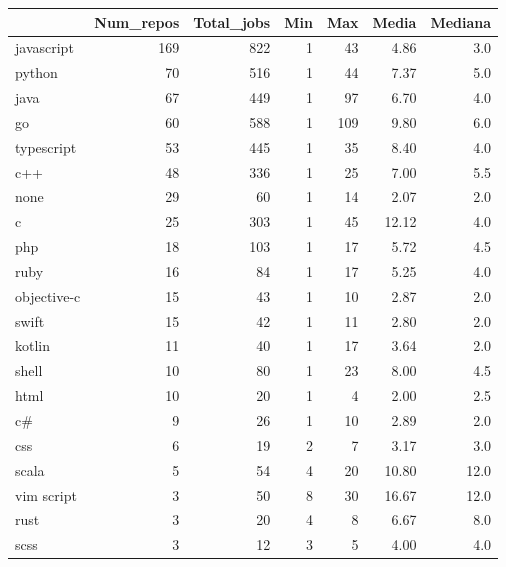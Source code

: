 \begin{tabular}{lrrrrrr}
\toprule
{} &  Num\_repos &  Total\_jobs &  Min &  Max &   Media &  Mediana \\
\midrule
javascript    &        169 &         822 &    1 &   43 &    4.86 &      3.0 \\
python        &         70 &         516 &    1 &   44 &    7.37 &      5.0 \\
java          &         67 &         449 &    1 &   97 &    6.70 &      4.0 \\
go            &         60 &         588 &    1 &  109 &    9.80 &      6.0 \\
typescript    &         53 &         445 &    1 &   35 &    8.40 &      4.0 \\
c++           &         48 &         336 &    1 &   25 &    7.00 &      5.5 \\
none          &         29 &          60 &    1 &   14 &    2.07 &      2.0 \\
c             &         25 &         303 &    1 &   45 &   12.12 &      4.0 \\
php           &         18 &         103 &    1 &   17 &    5.72 &      4.5 \\
ruby          &         16 &          84 &    1 &   17 &    5.25 &      4.0 \\
objective-c   &         15 &          43 &    1 &   10 &    2.87 &      2.0 \\
swift         &         15 &          42 &    1 &   11 &    2.80 &      2.0 \\
kotlin        &         11 &          40 &    1 &   17 &    3.64 &      2.0 \\
shell         &         10 &          80 &    1 &   23 &    8.00 &      4.5 \\
html          &         10 &          20 &    1 &    4 &    2.00 &      2.5 \\
c\#            &          9 &          26 &    1 &   10 &    2.89 &      2.0 \\
css           &          6 &          19 &    2 &    7 &    3.17 &      3.0 \\
scala         &          5 &          54 &    4 &   20 &   10.80 &     12.0 \\
vim script    &          3 &          50 &    8 &   30 &   16.67 &     12.0 \\
rust          &          3 &          20 &    4 &    8 &    6.67 &      8.0 \\
scss          &          3 &          12 &    3 &    5 &    4.00 &      4.0 \\

\end{tabular}

